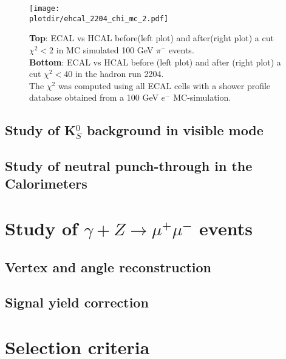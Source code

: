 \begin{figure}[h!]
  \begin{center}
    \texttt{[image: \\plotdir/ehcal\_2204\_chi\_mc\_2.pdf]}
  \end{center}
  \caption{\textbf{Top}: ECAL vs HCAL before(left plot) and
    after(right plot) a cut
    $\chi^2<2$ in MC simulated 100 GeV $\pi^-$ events. \\
    \textbf{Bottom}: ECAL vs HCAL before (left plot) and after (right
    plot) a cut
    $\chi^2<40$ in the hadron run 2204.\\
    The $\chi^2$ was computed using all ECAL cells with a shower
    profile database obtained from a 100 GeV $e^-$ MC-simulation. }
  \label{fig:ehcal_hadr}
\end{figure}

\clearpage
\newpage

\subsection{Study of K$^0_S$ background in visible mode}
\label{chapter3:sec:bkg-k0s}

\subsection{Study of neutral punch-through in the Calorimeters}
\label{chapter3:sec:bkg-neutrals}

\section{Study of $\gamma + Z \rightarrow \mu^+ \mu^-$ events }
\label{chapter3:sec:dimuons}


\subsection{Vertex and angle reconstruction}
\label{chapter3:sec:dimuons-reco}

\subsection{Signal yield correction}
\label{chapter3:sec:dimuons-sig-corr}

\section{Selection criteria}
\label{chapter3:sec:selection-criteria}

